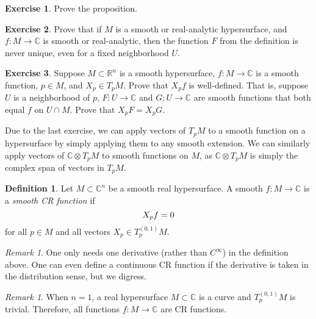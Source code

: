 \documentclass[12pt,openany]{book}
\newcommand{\avoidbreak}{\postdisplaypenalty=100}
\newcommand{\C}{{\mathbb{C}}}
\newcommand{\R}{{\mathbb{R}}}
\newcommand{\myindex}[1]{#1\index{#1}}
\theoremstyle{plain}
\theoremstyle{remark}
\newtheorem{remark}[thm]{Remark}
\theoremstyle{definition}
\newtheorem{defn}[thm]{Definition}
\newenvironment{exbox}{%
    \def\FrameCommand{\vrule width 1pt \relax\hspace{10pt}}%
    \MakeFramed{\advance\hsize-\width\FrameRestore}%
}{%
    \endMakeFramed
}
\theoremstyle{exercise}
\newtheorem{exercise}{Exercise}[section]
\theoremstyle{example}
\begin{document}
\begin{exbox}
\begin{exercise}
Prove the proposition.
\end{exercise}

\begin{exercise}
Prove that if $M$ is a smooth or real-analytic
hypersurface, and $f \colon M \to \C$ is smooth or real-analytic, then the function $F$ from the definition is never unique,
even for a fixed neighborhood $U$.
\end{exercise}

\begin{exercise}
Suppose $M \subset \R^n$ is a smooth hypersurface, $f \colon M \to \C$
is a smooth function, $p \in M$, and $X_p \in T_p M$.  Prove that
$X_p f$ is well-defined.
That is, suppose
$U$ is a neighborhood of $p$,
$F \colon U \to \C$ and $G \colon U \to \C$
are smooth functions that both equal $f$ on $U \cap M$.
Prove that
$X_p F = X_p G$.
\end{exercise}
\end{exbox}

Due to the last exercise, we can apply vectors of $T_p M$ to
a smooth function on a hypersurface by simply applying
them to any smooth extension.  We can similarly apply vectors of
$\C \otimes T_p M$ to smooth functions on $M$, as
$\C \otimes T_p M$ is simply the complex span of vectors in $T_p M$.

\begin{defn}
Let $M \subset \C^n$ be a smooth real hypersurface.
A smooth $f \colon M \to \C$ is a
\emph{\myindex{smooth CR function}} if
\begin{equation*}
X_p f = 0
\avoidbreak
\end{equation*}
for all $p \in M$ and all vectors $X_p \in T^{(0,1)}_p M$.
\end{defn}

\begin{remark}
One only needs one derivative (rather than $C^\infty$) in the definition
above.
One can even
define a continuous CR function if the derivative is taken in the
distribution sense, but we digress.
\end{remark}

\begin{remark}
When $n=1$, a real hypersurface $M \subset \C$ is a curve and $T^{(0,1)}_p M$
is trivial.  Therefore, all functions $f \colon M \to \C$ are CR functions.
\end{remark}
\end{document}
